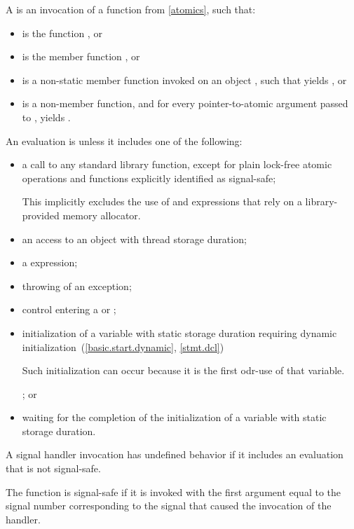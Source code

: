 \pnum
A  is
an invocation of a function  from \ref{atomics},
such that:
\begin{itemize}
\item
{} is the function , or

\item
{} is the member function , or

\item
{} is a non-static member function invoked on an object ,
such that  yields , or

\item
{} is a non-member function, and
for every pointer-to-atomic argument  passed to ,
 yields .
\end{itemize}

\pnum
{}%
An evaluation is  unless it includes one of the following:
\begin{itemize}
\item
a call to any standard library function,
except for plain lock-free atomic operations and
functions explicitly identified as signal-safe;
\begin{note}
This implicitly excludes the use of  and  expressions
that rely on a library-provided memory allocator.
\end{note}

\item
an access to an object with thread storage duration;

\item
a  expression;

\item
throwing of an exception;

\item
control entering a  or ;

\item
initialization of a variable with static storage duration
requiring dynamic initialization~(\ref{basic.start.dynamic}, \ref{stmt.dcl})
\begin{footnote}
Such initialization can occur because it is the first odr-use of that variable.
\end{footnote}
; or

\item
waiting for the completion of the initialization of a variable with static storage duration.
\end{itemize}

A signal handler invocation has undefined behavior if it includes
an evaluation that is not signal-safe.

\pnum
{}%
The function  is signal-safe if it is invoked
with the first argument equal to the signal number
corresponding to the signal that caused the invocation of the handler.

